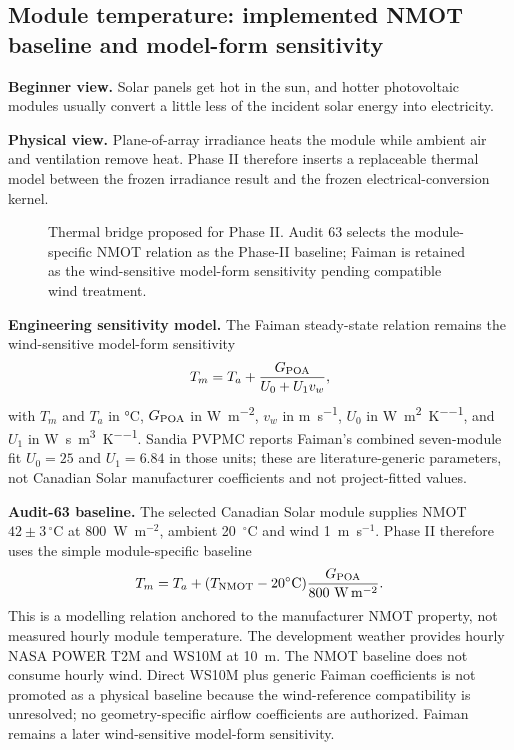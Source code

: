 \documentclass[11pt,a4paper]{article}
\begin{document}
\subsection{Module temperature: implemented NMOT baseline and model-form sensitivity}
\textbf{Beginner view.} Solar panels get hot in the sun, and hotter photovoltaic modules usually convert a little less of the incident solar energy into electricity.

\textbf{Physical view.} Plane-of-array irradiance heats the module while ambient air and ventilation remove heat. Phase II therefore inserts a replaceable thermal model between the frozen irradiance result and the frozen electrical-conversion kernel.

\begin{figure}[htbp]\centering

\caption{Thermal bridge proposed for Phase II. Audit 63 selects the module-specific NMOT relation as the Phase-II baseline; Faiman is retained as the wind-sensitive model-form sensitivity pending compatible wind treatment.}
\end{figure}

\textbf{Engineering sensitivity model.} The Faiman steady-state relation remains the wind-sensitive model-form sensitivity
\begin{equation}
T_m=T_a+\frac{G_{\rm POA}}{U_0+U_1 v_w},
\end{equation}
with $T_m$ and $T_a$ in \si{\degreeCelsius}, $G_{\rm POA}$ in \si{\watt\per\square\metre}, $v_w$ in \si{\metre\per\second}, $U_0$ in \si{\watt\per\square\metre\per\kelvin}, and $U_1$ in \si{\watt\second\per\cubic\metre\per\kelvin}. Sandia PVPMC reports Faiman's combined seven-module fit $U_0=25$ and $U_1=6.84$ in those units; these are literature-generic parameters, not Canadian Solar manufacturer coefficients and not project-fitted values.

\textbf{Audit-63 baseline.} The selected Canadian Solar module supplies NMOT $42\pm3\,^{\circ}$C at 800~W~m$^{-2}$, ambient 20~$^{\circ}$C and wind 1~m~s$^{-1}$. Phase II therefore uses the simple module-specific baseline
\begin{equation}
T_m=T_a+(T_{\rm NMOT}-20^{\circ}\mathrm{C})\frac{G_{\rm POA}}{800~\mathrm{W\,m^{-2}}}.
\end{equation}
This is a modelling relation anchored to the manufacturer NMOT property, not measured hourly module temperature. The development weather provides hourly NASA POWER T2M and WS10M at 10~m. The NMOT baseline does not consume hourly wind. Direct WS10M plus generic Faiman coefficients is not promoted as a physical baseline because the wind-reference compatibility is unresolved; no geometry-specific airflow coefficients are authorized. Faiman remains a later wind-sensitive model-form sensitivity.
\end{document}
